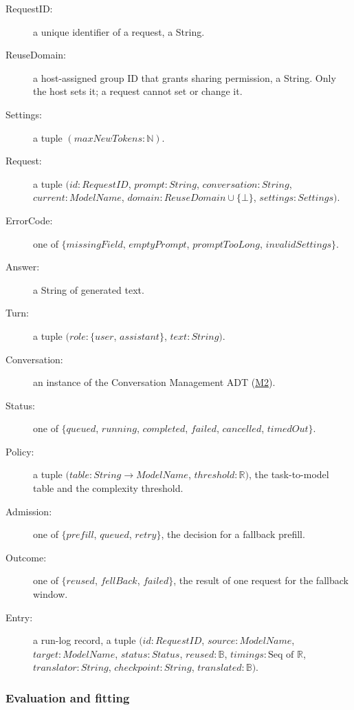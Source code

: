 \documentclass[12pt, titlepage]{article}
\begin{document}
\begin{description}
\item[RequestID:] a unique identifier of a request, a String.
\item[ReuseDomain:] a host-assigned group ID that grants sharing permission, a
  String. Only the host sets it; a request cannot set or change it.
\item[Settings:] a tuple $(\mathit{maxNewTokens}: \mathbb{N})$.
\item[Request:] a tuple $(\mathit{id}: \mathit{RequestID}$, $\mathit{prompt}:
  \mathit{String}$, $\mathit{conversation}: \mathit{String}$, $\mathit{current}:
  \mathit{ModelName}$, $\mathit{domain}: \mathit{ReuseDomain} \cup \{\bot\}$, $\mathit{settings}:
  \mathit{Settings})$.
\item[ErrorCode:] one of $\{\mathit{missingField}$, $\mathit{emptyPrompt}$, $\mathit{promptTooLong}$, $\mathit{invalidSettings}\}$.
\item[Answer:] a String of generated text.
\item[Turn:] a tuple $(\mathit{role}: \{\mathit{user}$, $\mathit{assistant}\}$, $\mathit{text}: \mathit{String})$.
\item[Conversation:] an instance of the Conversation Management ADT
  (\hyperref[mConv]{M2}).
\item[Status:] one of $\{\mathit{queued}$, $\mathit{running}$, $\mathit{completed}$, $\mathit{failed}$, $\mathit{cancelled}$, $\mathit{timedOut}\}$.
\item[Policy:] a tuple $(\mathit{table}: \mathit{String} \to \mathit{ModelName}$, $\mathit{threshold}: \mathbb{R})$, the task-to-model table and the complexity
  threshold.
\item[Admission:] one of $\{\mathit{prefill}$, $\mathit{queued}$, $\mathit{retry}\}$, the
  decision for a fallback prefill.
\item[Outcome:] one of $\{\mathit{reused}$, $\mathit{fellBack}$, $\mathit{failed}\}$, the
  result of one request for the fallback window.
\item[Entry:] a run-log record, a tuple $(\mathit{id}: \mathit{RequestID}$, $\mathit{source}: \mathit{ModelName}$, $\mathit{target}: \mathit{ModelName}$, $\mathit{status}: \mathit{Status}$, $\mathit{reused}: \mathbb{B}$, $\mathit{timings}:
  \text{Seq of } \mathbb{R}$, $\mathit{translator}: \mathit{String}$, $\mathit{checkpoint}: \mathit{String}$, $\mathit{translated}: \mathbb{B})$.
\end{description}

\subsubsection*{Evaluation and fitting}
\end{document}
